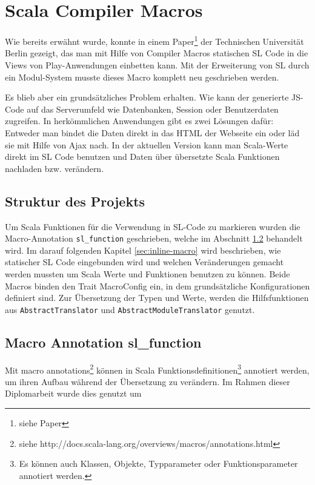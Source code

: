 \documentclass[12pt]{scrreprt}
\begin{document}
\chapter{Scala Compiler Macros}
\label{chap:scala-compiler-macros}

Wie bereits erwähnt wurde, konnte in einem Paper\footnote{siehe Paper} der Technischen Universität Berlin gezeigt, das man mit Hilfe von Compiler Macros statischen \ac{SL} Code in die Views von Play-Anwendungen einbetten kann. Mit der Erweiterung von \ac{SL} durch ein Modul-System musste dieses Macro komplett neu geschrieben werden.

Es blieb aber ein grundsätzliches Problem erhalten. Wie kann der generierte \ac{JS}-Code auf das Serverumfeld wie Datenbanken, Session oder Benutzerdaten zugreifen. In herkömmlichen Anwendungen gibt es zwei Lösungen dafür: Entweder man bindet die Daten direkt in das \ac{HTML} der Webseite ein oder läd sie mit Hilfe von Ajax nach. In der aktuellen Version kann man Scala-Werte direkt im \ac{SL} Code benutzen und Daten über übersetzte Scala Funktionen nachladen bzw. verändern.

\section{Struktur des Projekts}
\label{sec:project-structure}

Um Scala Funktionen für die Verwendung in \ac{SL}-Code zu markieren wurden die Macro-Annotation \lstinline!sl_function! geschrieben, welche im Abschnitt \ref{sec:annotation-macro} behandelt wird. Im darauf folgenden Kapitel \ref{sec:inline-macro} wird beschrieben, wie statischer \ac{SL} Code eingebunden wird und welchen Veränderungen gemacht werden mussten um Scala Werte und Funktionen benutzen zu können. Beide Macros binden den Trait MacroConfig ein, in dem grundsätzliche Konfigurationen definiert sind. Zur Übersetzung der Typen und Werte, werden die Hilfsfunktionen aus \lstinline!AbstractTranslator! und \lstinline!AbstractModuleTranslator! genutzt.

\section{Macro Annotation sl\_function }
\label{sec:annotation-macro}

Mit macro annotations\footnote{siehe http://docs.scala-lang.org/overviews/macros/annotations.html} können in Scala Funktionsdefinitionen\footnote{Es können auch Klassen, Objekte, Typparameter oder Funktionsparameter annotiert werden.} annotiert werden, um ihren Aufbau während der Übersetzung zu verändern. Im Rahmen dieser Diplomarbeit wurde dies genutzt um 
\end{document}

